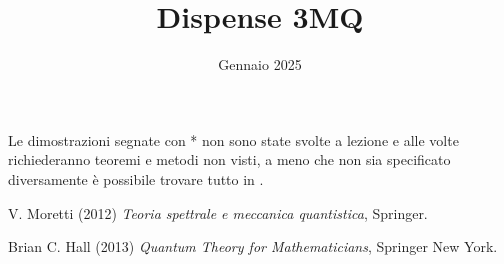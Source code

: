 \documentclass[12pt,a4paper]{report}
\theoremstyle{definition}
\numberwithin{equation}{section}
\theoremstyle{plain}
\theoremstyle{remark}
\DeclareMathOperator\Sw{ S(\mathbb{R}^n) }
\DeclareMathOperator\Cc{ C^\infty_c(\mathbb{R}^n) }
\DeclareMathOperator\B{ \mathfrak{B}(\mathcal{H}) }
\begin{document}
\title{Dispense 3MQ}
\date{Gennaio 2025}
\maketitle
\vspace{8.0cm}

Le dimostrazioni segnate con * non sono state svolte a lezione e alle volte richiederanno teoremi e metodi non visti, a meno che non sia specificato diversamente è possibile trovare tutto in \cite{Mor}.
$\B \; \Cc \Sw$
\vspace{1.0cm}


\newpage
\tableofcontents 
\newpage










\begin{thebibliography}{20}

V. Moretti (2012) \emph{Teoria spettrale e meccanica quantistica}, Springer.

Brian C. Hall (2013) \emph{Quantum Theory for Mathematicians}, Springer New York. 

\end{thebibliography}
\end{document}
